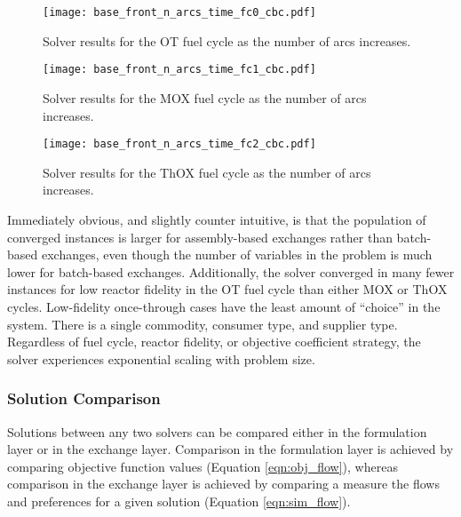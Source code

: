 \begin{figure}[h!]
  \begin{center}
    \texttt{[image: base\_front\_n\_arcs\_time\_fc0\_cbc.pdf]}
    \caption{
      \label{fig:base_front_n_arcs_time_fc0_cbc}
      \cbc Solver results for the OT fuel cycle as the number of arcs
      increases.
      }
  \end{center}
\end{figure}

\begin{figure}[h!]
  \begin{center}
    \texttt{[image: base\_front\_n\_arcs\_time\_fc1\_cbc.pdf]}
    \caption{
      \label{fig:base_front_n_arcs_time_fc1_cbc}
      \cbc Solver results for the MOX fuel cycle as the number of arcs
      increases.
      }
  \end{center}
\end{figure}

\begin{figure}[h!]
  \begin{center}
    \texttt{[image: base\_front\_n\_arcs\_time\_fc2\_cbc.pdf]}
    \caption{
      \label{fig:base_front_n_arcs_time_fc2_cbc}
      \cbc Solver results for the ThOX fuel cycle as the number of arcs
      increases.
      }
  \end{center}
\end{figure}

Immediately obvious, and slightly counter intuitive, is that the population of
converged instances is larger for assembly-based exchanges rather than
batch-based exchanges, even though the number of variables in the problem is
much lower for batch-based exchanges. Additionally, the \cbc solver converged in
many fewer instances for low reactor fidelity in the OT fuel cycle than either
MOX or ThOX cycles. Low-fidelity once-through cases have the least amount of
``choice'' in the system. There is a single commodity, consumer type, and
supplier type. Regardless of fuel cycle, reactor fidelity, or objective
coefficient strategy, the \cbc solver experiences exponential scaling with
problem size.

\subsubsection{Solution Comparison}\label{sec:res:scale:front:soln}

Solutions between any two solvers can be compared either in the formulation
layer or in the exchange layer. Comparison in the formulation layer is achieved
by comparing objective function values (Equation \ref{eqn:obj_flow}), whereas
comparison in the exchange layer is achieved by comparing a measure the flows
and preferences for a given solution (Equation \ref{eqn:sim_flow}). 

